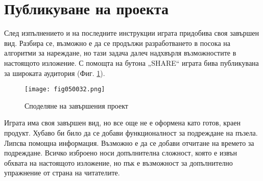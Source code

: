 \section{Публикуване на проекта}

След изпълнението и на последните инструкции играта придобива своя завършен вид. Разбира се, възможно е да се продължи разработването в посока на алгоритми за нареждане, но тази задача далеч надхвърля възможностите в настоящото изложение. С помощта на бутона „SHARE“ играта бива публикувана за широката аудитория (Фиг. \ref{fig050032}).

\begin{figure}[H]
  \centering
  \texttt{[image: fig050032.png]}
  \caption{Споделяне на завършения проект}
\label{fig050032}
\end{figure}

Играта има своя завършен вид, но все още не е оформена като готов, краен продукт. Хубаво би било да се добави функционалност за подреждане на пъзела. Липсва помощна информация. Възможно е да се добави отчитане на времето за подреждане. Всичко изброено носи допълнителна сложност, която е извън обхвата на настоящото изложение, но пък е възможност за допълнително упражнение от страна на читателите.

